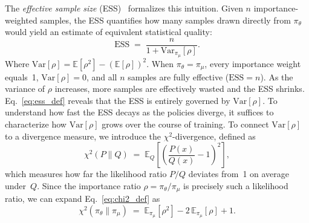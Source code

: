 \documentclass[runningheads]{llncs}
\begin{document}
The \emph{effective sample size} (ESS)~\cite{kong1992note} formalizes this intuition.
Given $n$ importance-weighted samples, the ESS quantifies how many samples drawn directly from $\pi_\theta$ would yield an estimate of equivalent statistical quality:
\begin{equation}
    \mathrm{ESS}
    \;=\; \frac{n}{1 + \mathrm{Var}_{\pi_\mu}[\rho]}.
    \label{eq:ess_def}
\end{equation}
Where $\mathrm{Var}[\rho] = \mathbb{E}[\rho^2] - (\mathbb{E}[\rho])^2$. 
When $\pi_\theta = \pi_\mu$, every importance weight equals~1, $\mathrm{Var}[\rho] = 0$, and all $n$ samples are fully effective ($\mathrm{ESS} = n$).
As the variance of $\rho$ increases, more samples are effectively wasted and the ESS shrinks.
Eq.~\eqref{eq:ess_def} reveals that the ESS is entirely governed by $\mathrm{Var}[\rho]$. To understand how fast the ESS decays as the policies diverge, it suffices to characterize how $\mathrm{Var}[\rho]$ grows over the course of training.
To connect $\mathrm{Var}[\rho]$ to a divergence measure, we introduce the $\chi^2$-divergence, defined as
\begin{equation}
    \chi^2(P \| Q)
    \;=\; \mathbb{E}_{Q}\!\left[\left(\frac{P(x)}{Q(x)} - 1\right)^{\!2}\right],
    \label{eq:chi2_def}
\end{equation}
which measures how far the likelihood ratio $P/Q$ deviates from~1 on average under~$Q$.
Since the importance ratio $\rho = \pi_\theta / \pi_\mu$ is precisely such a likelihood ratio, we can expand Eq.~\eqref{eq:chi2_def} as
\begin{equation}
    \chi^2\!\left(\pi_\theta \| \pi_\mu\right)
    \;=\; \mathbb{E}_{\pi_\mu}[\rho^2]
    - 2\,\mathbb{E}_{\pi_\mu}[\rho] + 1.
    \label{eq:chi2_expand}
\end{equation}
\end{document}
